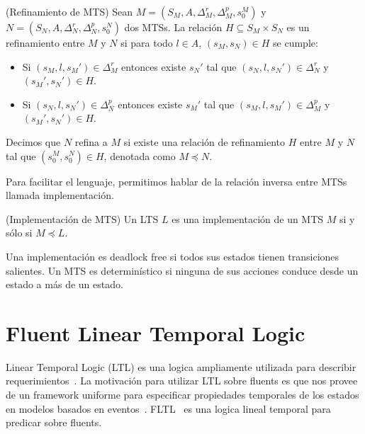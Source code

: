 \begin{definition}{(Refinamiento de MTS)}
Sean $M = (S_{M}, A, \Delta_{M}^{r}, \Delta_{M}^{p}, s_{0}^{M})$ y\\
$N = (S_{N}, A, \Delta_{N}^{r}, \Delta_{N}^{p}, s_{0}^{N})$ dos MTSs. La relación $H \subseteq S_{M} \times S_{N}$ es un refinamiento 
entre $M$ y $N$ si para todo $l \in A$, $(s_{M}, s_{N}) \in H$ se cumple:

\begin{itemize}
\item
Si $(s_{M}, l, s_{M}') \in \Delta_{M}^{r}$ entonces existe $s_{N}'$ tal que $(s_{N}, l, s_{N}') \in \Delta_{N}^{r}$ y $(s_{M}', s_{N}') \in H$.
\item
Si $(s_{N}, l, s_{N}') \in \Delta_{N}^{p}$ entonces existe $s_{M}'$ tal que $(s_{M}, l, s_{M}') \in \Delta_{M}^{p}$ y $(s_{M}', s_{N}') \in H$.
\end{itemize}

Decimos que $N$ refina a $M$ si existe una relación de refinamiento $H$ entre $M$ y $N$ tal que $(s_{0}^{M}, s_{0}^{N}) \in H$, denotada como $M \preceq N$.

\end{definition}

Para facilitar el lenguaje, permitimos hablar de la relación inversa entre MTSs 
llamada implementación.

\begin{definition}{(Implementación de MTS)}
Un LTS $L$ es una implementación de un MTS $M$ si y sólo si $M \preceq L$.
\end{definition}

Una implementación es deadlock free si todos sus estados tienen transiciones salientes. 
Un MTS es determinístico si ninguna de sus acciones conduce desde un estado a más de un estado.

\section{Fluent Linear Temporal Logic}
\label{sec:FLTL}

Linear Temporal Logic (LTL) es una logica ampliamente utilizada para describir 
requerimientos~\cite{vanLamsweerde:2000:HOG:357525.357521}. La motivación para 
utilizar LTL sobre fluents es que 
nos provee de un framework uniforme para especificar propiedades temporales de 
los estados en modelos basados en 
eventos~\cite{vanLamsweerde:2000:HOG:357525.357521}.
FLTL~\cite{FLTL} es una logica lineal temporal para predicar sobre fluents.

